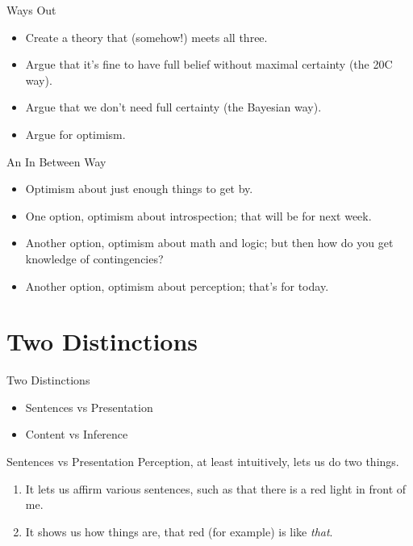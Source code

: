 \documentclass[
  17pt,
  letterpaper,
  ignorenonframetext,
  aspectratio=169,
  handout]{beamer}
\providecommand{\tightlist}{%
  \setlength{\itemsep}{0pt}\setlength{\parskip}{0pt}}\usepackage{longtable,booktabs,array}
\begin{document}
\begin{frame}{Ways Out}
\protect\hypertarget{ways-out}{}
\begin{itemize}[<+->]
\tightlist
\item
  Create a theory that (somehow!) meets all three.
\item
  Argue that it's fine to have full belief without maximal certainty
  (the 20C way).
\item
  Argue that we don't need full certainty (the Bayesian way).
\item
  Argue for optimism.
\end{itemize}
\end{frame}

\begin{frame}{An In Between Way}
\protect\hypertarget{an-in-between-way}{}
\begin{itemize}[<+->]
\tightlist
\item
  Optimism about just enough things to get by.
\item
  One option, optimism about introspection; that will be for next week.
\item
  Another option, optimism about math and logic; but then how do you get
  knowledge of contingencies?
\item
  Another option, optimism about perception; that's for today.
\end{itemize}
\end{frame}

\hypertarget{two-distinctions}{%
\section{Two Distinctions}\label{two-distinctions}}

\begin{frame}{Two Distinctions}
\protect\hypertarget{two-distinctions-1}{}
\begin{itemize}[<+->]
\tightlist
\item
  Sentences vs Presentation
\item
  Content vs Inference
\end{itemize}
\end{frame}

\begin{frame}{Sentences vs Presentation}
\protect\hypertarget{sentences-vs-presentation}{}
Perception, at least intuitively, lets us do two things.

\begin{enumerate}[<+->]
\tightlist
\item
  It lets us affirm various sentences, such as that there is a red light
  in front of me.
\item
  It shows us how things are, that red (for example) is like
  \emph{that}.
\end{enumerate}
\end{frame}
\end{document}
